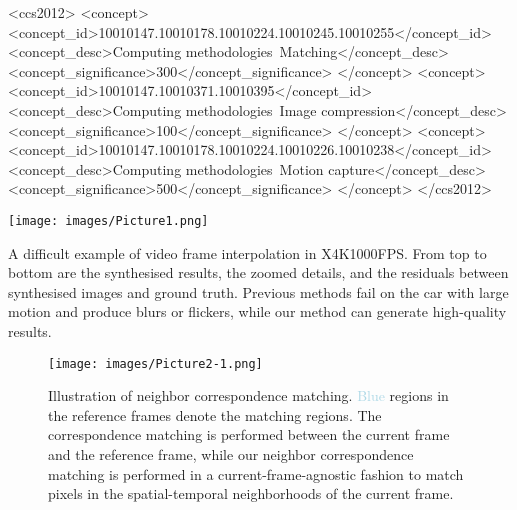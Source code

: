 \documentclass[sigconf]{acmart}
\begin{document}
\begin{CCSXML}
<ccs2012>
   <concept>
       <concept_id>10010147.10010178.10010224.10010245.10010255</concept_id>
       <concept_desc>Computing methodologies~Matching</concept_desc>
       <concept_significance>300</concept_significance>
       </concept>
   <concept>
       <concept_id>10010147.10010371.10010395</concept_id>
       <concept_desc>Computing methodologies~Image compression</concept_desc>
       <concept_significance>100</concept_significance>
       </concept>
   <concept>
       <concept_id>10010147.10010178.10010224.10010226.10010238</concept_id>
       <concept_desc>Computing methodologies~Motion capture</concept_desc>
       <concept_significance>500</concept_significance>
       </concept>
 </ccs2012>
\end{CCSXML}



\begin{teaserfigure}
    \texttt{[image: images/Picture1.png]}
    \caption{A difficult example of video frame interpolation in X4K1000FPS\cite{sim2021xvfi}. From top to bottom are the synthesised results, the zoomed details, and the residuals between synthesised images and ground truth. Previous methods fail on the car with large motion and produce blurs or flickers, while our method can generate high-quality results.}
    \label{fig1}
\end{teaserfigure}



 \renewcommand\footnotetextcopyrightpermission[1]{} \pagestyle{plain} 

\maketitle

\begin{figure*}
    \texttt{[image: images/Picture2-1.png]}
    \caption{Illustration of neighbor correspondence matching. \textcolor{lightblue}{Blue} regions in the reference frames denote the matching regions. The correspondence matching \cite{cheng2021rethinking,teed2020raft} is performed between the current frame and the reference frame, while our neighbor correspondence matching is performed in a current-frame-agnostic fashion to match pixels in the spatial-temporal neighborhoods of the current frame.}
    \label{fig2}
\end{figure*}
\end{document}
